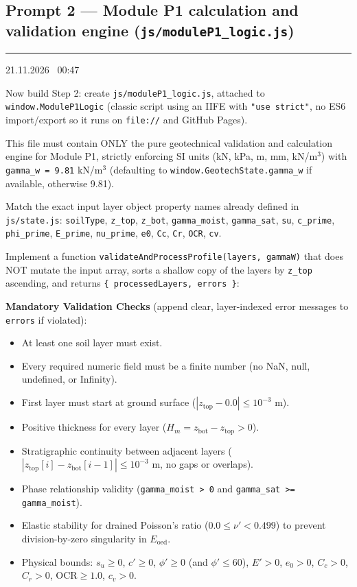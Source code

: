 \documentclass[11pt,a4paper]{article}
\newcommand{\stamp}[1]{{\small\bfseries\color{black!70}\textcolor{accent}{\rule[-2pt]{2pt}{10pt}}\hspace{6pt}#1}\par}
\newcommand{\code}[1]{\texttt{\small #1}}
\begin{document}
\subsection{Prompt 2 --- Module P1 calculation and validation engine (\code{js/moduleP1\_logic.js})}
\stamp{21.11.2026 \textbar\ 00:47}
\begin{prompt}
Now build Step 2: create \code{js/moduleP1\_logic.js}, attached to \code{window.ModuleP1Logic} (classic script using
an IIFE with \code{"use strict"}, no ES6 import/export so it runs on \code{file://} and GitHub Pages).

This file must contain ONLY the pure geotechnical validation and calculation engine for Module P1, strictly enforcing
SI units (kN, kPa, m, mm, kN/m$^3$) with \code{gamma\_w = 9.81} kN/m$^3$ (defaulting to
\code{window.GeotechState.gamma\_w} if available, otherwise 9.81).

Match the exact input layer object property names already defined in \code{js/state.js}: \code{soilType},
\code{z\_top}, \code{z\_bot}, \code{gamma\_moist}, \code{gamma\_sat}, \code{su}, \code{c\_prime}, \code{phi\_prime},
\code{E\_prime}, \code{nu\_prime}, \code{e0}, \code{Cc}, \code{Cr}, \code{OCR}, \code{cv}.

Implement a function \code{validateAndProcessProfile(layers, gammaW)} that does NOT mutate the input array, sorts a
shallow copy of the layers by \code{z\_top} ascending, and returns \code{\{ processedLayers, errors \}}:

\textbf{Mandatory Validation Checks} (append clear, layer-indexed error messages to \code{errors} if violated):
\begin{itemize}
\item At least one soil layer must exist.
\item Every required numeric field must be a finite number (no NaN, null, undefined, or Infinity).
\item First layer must start at ground surface ($|z_\text{top} - 0.0| \le 10^{-3}$ m).
\item Positive thickness for every layer ($H_m = z_\text{bot} - z_\text{top} > 0$).
\item Stratigraphic continuity between adjacent layers ($|z_\text{top}[i] - z_\text{bot}[i-1]| \le 10^{-3}$ m, no
  gaps or overlaps).
\item Phase relationship validity (\code{gamma\_moist > 0} and \code{gamma\_sat >= gamma\_moist}).
\item Elastic stability for drained Poisson's ratio ($0.0 \le \nu' < 0.499$) to prevent division-by-zero singularity
  in $E_\text{oed}$.
\item Physical bounds: $s_u \ge 0$, $c' \ge 0$, $\phi' \ge 0$ (and $\phi' \le 60$), $E' > 0$, $e_0 > 0$,
  $C_c > 0$, $C_r > 0$, $\text{OCR} \ge 1.0$, $c_v > 0$.
\end{itemize}


\end{prompt}
\end{document}
